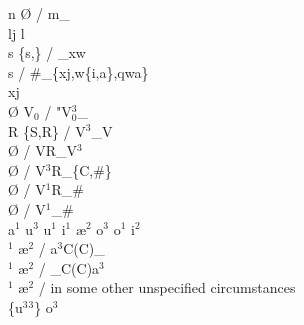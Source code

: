 \documentclass[11pt]{article}
\begin{document}
n \textrightarrow\hspace{0pt} \O\hspace{0pt} / m_ \\
l\super j \textrightarrow\hspace{0pt} l \\
s \textrightarrow\hspace{0pt} \{s,\} / _x\super w \\
s \textrightarrow\hspace{0pt}  / \#_\{x\super j,w\{i,a\},q\super wa\} \\
x\super j \textrightarrow\hspace{0pt}  \\
\O\hspace{0pt} \textrightarrow\hspace{0pt} V$_0$ / "V$^3_0$_ \\
R \textrightarrow\hspace{0pt} \{S,R\} / V$^3$_V \\
 \textrightarrow\hspace{0pt} \O\hspace{0pt} / VR_V$^3$ \\
 \textrightarrow\hspace{0pt} \O\hspace{0pt} / V$^3$R_\{C,\#\} \\
 \textrightarrow\hspace{0pt} \O\hspace{0pt} / V$^1$R_\# \\
 \textrightarrow\hspace{0pt} \O\hspace{0pt} / V$^1$_\# \\
a$^1$ u$^3$ u$^1$ i$^1$ \textrightarrow\hspace{0pt} \ae$^2$ o$^3$ o$^1$ i$^2$ \\
$^1$ \textrightarrow\hspace{0pt} \ae$^2$ / a$^3$C(C)_ \\
$^1$ \textrightarrow\hspace{0pt} \ae$^2$ / _C(C)a$^3$ \\
$^1$ \textrightarrow\hspace{0pt} \ae$^2$ / in some other unspecified circumstances \\
\{u$^3$\raisebox{-0.7ex}{\textasciitilde}$^3$\} \textrightarrow\hspace{0pt} o$^3$ \\
\end{document}
